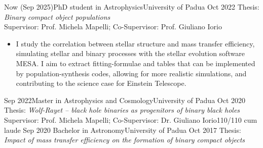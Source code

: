 %
%
%
\begin{experiences}
  \experiencetags
    {Now (Sep 2025)}{PhD student in Astrophysics}{University of Padua}
    {Oct 2022}
    {Thesis: \textit{Binary compact object populations} \\
    Supervisor: Prof. Michela Mapelli; Co-Supervisor: Prof. Giuliano Iorio }{
    \begin{itemize}
        \item  I study the correlation between stellar structure and mass transfer efficiency, simulating stellar and binary processes with the stellar evolution software MESA. I aim to extract fitting-formulae and tables that can be implemented by population-synthesis codes, allowing for more realistic simulations, and contributing to the science case for Einstein Telescope.
    \end{itemize}
   }{}%
  \emptySeparator
  \experiencetagsend
    {Sep 2022}{Master in Astrophysics and Cosmology}{University of Padua}
    {Oct 2020} 
    {Thesis: \textit{Wolf-Rayet -- black hole binaries as progenitors of binary black holes} \\
    Supervisor: Prof. Michela Mapelli; Co-Supervisor: Dr. Giuliano Iorio}{110/110 cum laude}
    {}%
  \emptySeparator
  \experiencetagsend
    {Sep 2020}   {Bachelor in Astronomy}{University of Padua}
    {Oct 2017} 
    {Thesis: \textit{Impact of mass transfer efficiency on the formation of binary compact objects} \\
}
\end{experiences}
